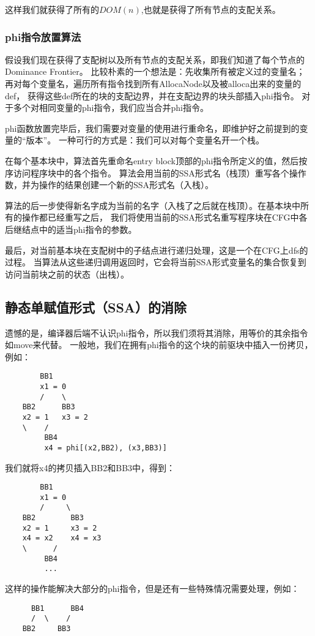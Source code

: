这样我们就获得了所有的$DOM(n)$,也就是获得了所有节点的支配关系。
\subsubsection{phi指令放置算法}
假设我们现在获得了支配树以及所有节点的支配关系，即我们知道了每个节点的Dominance Frontier。
比较朴素的一个想法是：先收集所有被定义过的变量名；再对每个变量名，遍历所有指令找到所有AllocaNode以及被alloca出来的变量的def，
获得这些def所在的块的支配边界，并在支配边界的块头部插入phi指令。
对于多个对相同变量的phi指令，我们应当合并phi指令。

phi函数放置完毕后，我们需要对变量的使用进行重命名，即维护好之前提到的变量的“版本”。
一种可行的方式是：我们可以对每个变量名开一个栈。

在每个基本块中，算法首先重命名entry block顶部的phi指令所定义的值，然后按序访问程序块中的各个指令。
算法会用当前的SSA形式名（栈顶）重写各个操作数，并为操作的结果创建一个新的SSA形式名（入栈）。

算法的后一步使得新名字成为当前的名字（入栈了之后就在栈顶）。在基本块中所有的操作都已经重写之后，
我们将使用当前的SSA形式名重写程序块在CFG中各后继结点中的适当phi指令的参数。

最后，对当前基本块在支配树中的子结点进行递归处理，这是一个在CFG上dfs的过程。
当算法从这些递归调用返回时，它会将当前SSA形式变量名的集合恢复到访问当前块之前的状态（出栈）。

\subsection{静态单赋值形式（SSA）的消除}
遗憾的是，编译器后端不认识phi指令，所以我们须将其消除，用等价的其余指令如move来代替。
一般地，我们在拥有phi指令的这个块的前驱块中插入一份拷贝，例如：
\begin{lstlisting}
        BB1
        x1 = 0
        /    \
    BB2      BB3
    x2 = 1   x3 = 2
    \    /
         BB4
         x4 = phi[(x2,BB2), (x3,BB3)]
\end{lstlisting}

我们就将x4的拷贝插入BB2和BB3中，得到：
\begin{lstlisting}
        BB1
        x1 = 0
        /     \
    BB2        BB3
    x2 = 1     x3 = 2
    x4 = x2    x4 = x3
    \      /
         BB4
         ...
\end{lstlisting}

这样的操作能解决大部分的phi指令，但是还有一些特殊情况需要处理，例如：
\begin{lstlisting}
      BB1      BB4
      /  \    /   
    BB2     BB3     
\end{lstlisting}

